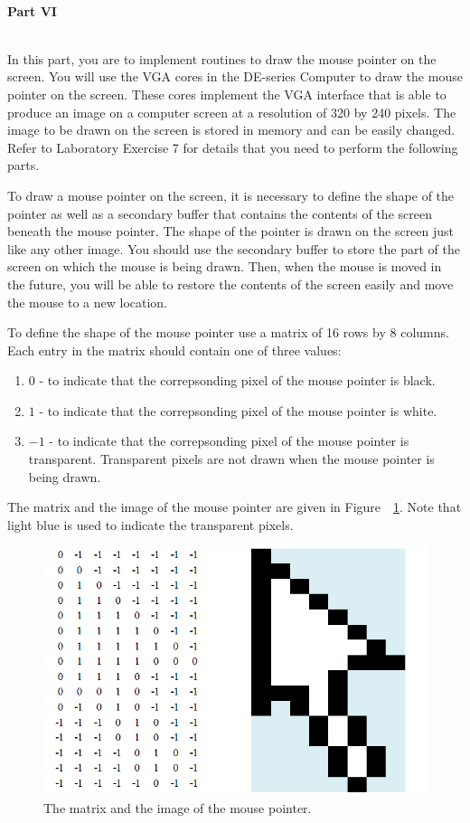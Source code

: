 \documentclass[epsfig,10pt,fullpage]{article}
\begin{document}
~\\
\noindent
{\bf Part VI}

~\\
\noindent
In this part, you are to implement routines to draw the mouse pointer on the screen. You will use the VGA cores in the DE-series Computer to draw the mouse pointer on the screen. These cores implement the VGA interface that is able to produce an image on a computer screen at a resolution of 320 by 240 pixels. The image to be drawn on the screen is stored in memory and can be easily changed. Refer to Laboratory Exercise 7 for details that you need to perform the following parts. 

To draw a mouse pointer on the screen, it is necessary to define the shape of the pointer as well as a secondary buffer that contains the contents of the screen beneath the mouse pointer. The shape of the pointer is drawn on the screen just like any other image. You should use the secondary buffer to store the part of the screen on which the mouse is being drawn. Then, when the mouse is moved in the future, you will be able to restore the contents of the screen easily and move the mouse to a new location.

To define the shape of the mouse pointer use a matrix of 16 rows by 8 columns. Each entry in the matrix should contain one of three values:
\begin{enumerate}
	\item $0$ - to indicate that the correpsonding pixel of the mouse pointer is black.
	\item $1$ - to indicate that the correpsonding pixel of the mouse pointer is white.
	\item $-1$ - to indicate that the correpsonding pixel of the mouse pointer is transparent. Transparent pixels are not drawn when the mouse pointer is being drawn.
\end{enumerate}

\noindent
The matrix and the image of the mouse pointer are given in Figure~~\ref{fig:mouse_pointer}. Note that light blue is used to indicate the transparent pixels.

\begin{figure}[H]
	\centering
	\includegraphics[scale=0.60]{figures/mouse_pointer.png}
	\caption{The matrix and the image of the mouse pointer.}
	\label{fig:mouse_pointer}
\end{figure}
\end{document}
